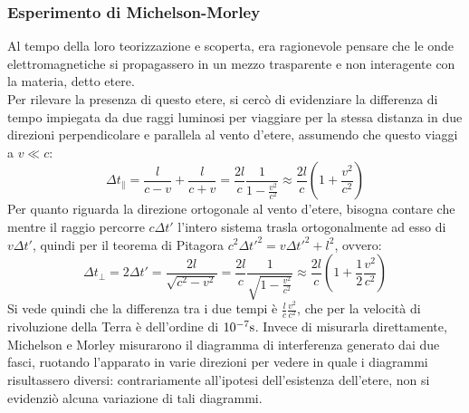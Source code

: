 \subsubsection{Esperimento di Michelson-Morley}

Al tempo della loro teorizzazione e scoperta, era ragionevole pensare che le onde elettromagnetiche si propagassero in un mezzo trasparente e non interagente con la materia, detto etere. \\ 
%
Per rilevare la presenza di questo etere, si cercò di evidenziare la differenza di tempo impiegata da due raggi luminosi per viaggiare per la stessa distanza in due direzioni perpendicolare e parallela al vento d'etere, assumendo che questo viaggi a $ v \ll c $:
\begin{equation}
	\Delta t_{\parallel} = \frac{l}{c-v} + \frac{l}{c+v} = \frac{2l}{c}\frac{1}{1 - \frac{v^2}{c^2}} \approx \frac{2l}{c}\left(1 + \frac{v^2}{c^2}\right)
	\label{eq:2}
\end{equation}
Per quanto riguarda la direzione ortogonale al vento d'etere, bisogna contare che mentre il raggio percorre $ c\Delta t' $ l'intero sistema trasla ortogonalmente ad esso di $ v\Delta t' $, quindi per il teorema di Pitagora $ c^2 \Delta t'^2 = v \Delta t'^2 + l^2 $, ovvero:
\begin{equation}
	\Delta t_{\perp} = 2 \Delta t' = \frac{2l}{\sqrt{c^2 - v^2}} = \frac{2l}{c} \frac{1}{\sqrt{1 - \frac{v^2}{c^2}}} \approx \frac{2l}{c} \left(1 + \frac{1}{2}\frac{v^2}{c^2}\right)
	\label{eq:3}
\end{equation}
Si vede quindi che la differenza tra i due tempi è $ \frac{l}{c}\frac{v^2}{c^2} $, che per la velocità di rivoluzione della Terra è dell'ordine di $ 10^{-7} \text{s} $. Invece di misurarla direttamente, Michelson e Morley misurarono il diagramma di interferenza generato dai due fasci, ruotando l'apparato in varie direzioni per vedere in quale i diagrammi risultassero diversi: contrariamente all'ipotesi dell'esistenza dell'etere, non si evidenziò alcuna variazione di tali diagrammi.


%
%

